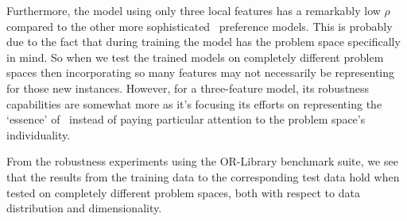 Furthermore, the model using only three local features has a remarkably low 
$\rho$ compared to the other more sophisticated \phiLocalRelated\ preference 
models. This is probably due to the fact that during training the model has  
the  problem space specifically in mind. So when we test the 
trained models on completely different problem spaces then incorporating so 
many features may not necessarily be representing for those new instances. 
However, for a three-feature model, its robustness capabilities are somewhat 
more as it's focusing its efforts on representing the `essence' of \jsp\ 
instead of paying particular attention to the problem space's individuality. 

From the robustness experiments using the OR-Library benchmark suite, we see 
that the results from the training data to the corresponding test data hold 
when tested on completely different problem spaces, both with respect to data 
distribution and dimensionality.